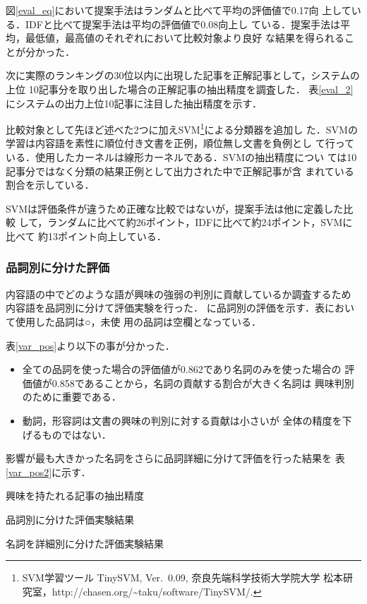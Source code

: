 \documentclass[japanese]{jnlp_1.4}
\newcounter{ex}
\def\tableref#1{}
\begin{document}
図\ref{eval_eq}において提案手法はランダムと比べて平均の評価値で0.17向
上している．IDFと比べて提案手法は平均の評価値で0.08向上し
ている．提案手法は平均，最低値，最高値のそれぞれにおいて比較対象より良好
な結果を得られることが分かった．


次に実際のランキングの30位以内に出現した記事を正解記事として，システムの上位
10記事分を取り出した場合の正解記事の抽出精度を調査した．
表\ref{eval_2}にシステムの出力上位10記事に注目した抽出精度を示す．

比較対象として先ほど述べた2つに加えSVM\footnote{
SVM学習ツール TinySVM, Ver.~0.09, 奈良先端科学技術大学院大学 松本研究室，http://chasen.org/\~{}taku/\linebreak[2]software/TinySVM/.
}による分類器を追加し
た．SVMの学習は内容語を素性に順位付き文書を正例，順位無し文書を負例とし
て行っている．使用したカーネルは線形カーネルである．SVMの抽出精度につい
ては10記事分ではなく分類の結果正例として出力された中で正解記事が含
まれている割合を示している．


SVMは評価条件が違うため正確な比較ではないが，提案手法は他に定義した比較
して，ランダムに比べて約26ポイント，IDFに比べて約24ポイント，SVMに比べて
約13ポイント向上している．



\subsubsection{品詞別に分けた評価}\label{pos_vary}

内容語の中でどのような語が興味の強弱の判別に貢献しているか調査するため
内容語を品詞別に分けて評価実験を行った．
\tableref{var_pos}に品詞別の評価を示す．表において使用した品詞は○，未使
用の品詞は空欄となっている．

表\ref{var_pos}より以下の事が分かった．
\begin{itemize}
\item 全ての品詞を使った場合の評価値が0.862であり名詞のみを使った場合の
      評価値が0.858であることから，名詞の貢献する割合が大きく名詞は
      興味判別のために重要である．
 \item 動詞，形容詞は文書の興味の判別に対する貢献は小さいが
      全体の精度を下げるものではない．
\end{itemize}

影響が最も大きかった名詞をさらに品詞詳細に分けて評価を行った結果を
表\ref{var_pos2}に示す．

\begin{table}[b]
\begin{minipage}{0.45\textwidth}
\caption{興味を持たれる記事の抽出精度}

\label{eval_2}
\end{minipage}
\begin{minipage}{0.45\textwidth}
\caption{品詞別に分けた評価実験結果}

\label{var_pos}
\end{minipage}
\end{table}
\begin{table}[b]
\caption{名詞を詳細別に分けた評価実験結果}

\label{var_pos2}
\end{table}
\end{document}
